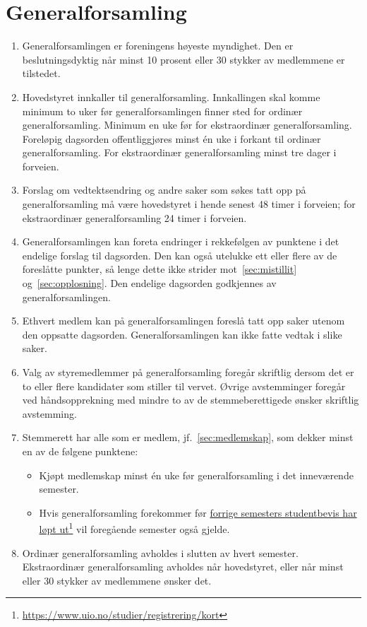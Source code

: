 \documentclass[8pt,norsk,a4paper]{article}
\newcommand\fhref[2]{%
	\href{#1}{#2}\footnote{\url{#1}}%
}
\begin{document}
\section{Generalforsamling}
\begin{enumerate}
	\item{Generalforsamlingen er foreningens høyeste myndighet. Den er beslutningsdyktig når minst 10 prosent eller 30 stykker av medlemmene er tilstedet.}
	\item{Hovedstyret innkaller til generalforsamling. Innkallingen skal komme minimum to uker før generalforsamlingen finner sted for ordinær generalforsamling. Minimum en uke før for ekstraordinær generalforsamling. Foreløpig dagsorden offentliggjøres minst én uke i forkant til ordinær generalforsamling. For ekstraordinær generalforsamling minst tre dager i forveien.}
	\item{Forslag om vedtektsendring og andre saker som søkes tatt opp på generalforsamling må være hovedstyret i hende senest 48 timer i forveien; for ekstraordinær generalforsamling 24 timer i forveien.}
	\item{Generalforsamlingen kan foreta endringer i rekkefølgen av punktene i det endelige forslag til dagsorden. Den kan også utelukke ett eller flere av de foreslåtte punkter, så lenge dette ikke strider mot~\ref{sec:mistillit} og~\ref{sec:opplosning}. Den endelige dagsorden godkjennes av generalforsamlingen.}
	\item{Ethvert medlem kan på generalforsamlingen foreslå tatt opp saker utenom den oppsatte dagsorden. Generalforsamlingen kan ikke fatte vedtak i slike saker.}
	\item{Valg av styremedlemmer på generalforsamling foregår skriftlig dersom det er to eller flere kandidater som stiller til vervet. Øvrige avstemminger foregår ved håndsopprekning med mindre to av de stemmeberettigede ønsker skriftlig avstemming.}
	\item{Stemmerett har alle som er medlem, jf.~\ref{sec:medlemskap}, som dekker minst en av de følgene punktene:}
	\begin{itemize}
	    \item{Kjøpt medlemskap minst én uke før generalforsamling i det inneværende semester.}
	    \item{Hvis generalforsamling forekommer før \fhref{https://www.uio.no/studier/registrering/kort}{forrige semesters studentbevis har løpt ut} vil foregående semester også gjelde.}
	\end{itemize}
	\item{Ordinær generalforsamling avholdes i slutten av hvert semester. Ekstraordinær generalforsamling avholdes når hovedstyret, eller når minst  eller 30 stykker av medlemmene ønsker det.}

\end{enumerate}
\end{document}
